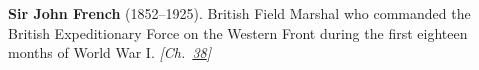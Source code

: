\textbf{Sir John French} (1852–1925). British Field Marshal who commanded the British Expeditionary Force on the Western Front during the first eighteen months of World War I. \emph{[Ch.~\hyperref[ch:christmastruce1914]{38}]}

